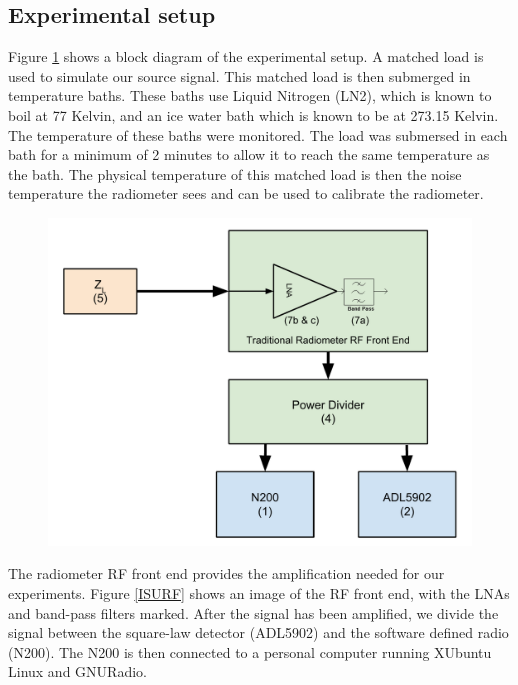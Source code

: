 \subsection{Experimental setup} \label{exp1_setup}

Figure \ref{Exp1_Block} shows a block diagram of the experimental setup.  A matched load is used to simulate our source signal.  This matched load is then submerged in temperature baths.  These baths use Liquid Nitrogen (LN2), which is known to boil at 77 Kelvin, and an ice water bath which is known to be at 273.15 Kelvin.  The temperature of these baths were monitored.  The load was submersed in each bath for a minimum of 2 minutes to allow it to reach the same temperature as the bath.  The physical temperature of this matched load is then the noise temperature the radiometer sees and can be used to calibrate the radiometer.  

{\begin{figure}[h!tb] \centering
\includegraphics[width=13cm]{Images/Exp_1_Setup.pdf}
\label{Exp1_Block}
\end{figure}
}

The radiometer RF front end provides the amplification needed for our experiments.  Figure \ref{ISURF} shows an image of the RF front end, with the LNAs and band-pass filters marked.  After the signal has been amplified, we divide the signal between the square-law detector (ADL5902) and the software defined radio (N200).  The N200 is then connected to a personal computer running XUbuntu Linux and GNURadio.

